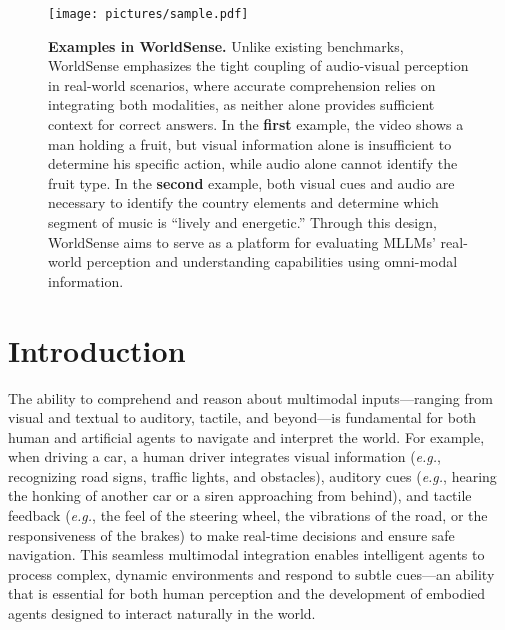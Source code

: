 \begin{figure*}[!htb]
  \centering
  \texttt{[image: pictures/sample.pdf]}
  \caption{\textbf{Examples in WorldSense.} 
  Unlike existing benchmarks, WorldSense emphasizes the tight coupling of audio-visual perception in real-world scenarios, where accurate comprehension relies on integrating both modalities, as neither alone provides sufficient context for correct answers. In the \textbf{first} example, the video shows a man holding a fruit, but visual information alone is insufficient to determine his specific action, while audio alone cannot identify the fruit type. In the \textbf{second} example, both visual cues and audio are necessary to identify the country elements and determine which segment of music is “lively and energetic.” Through this design, WorldSense aims to serve as a platform for evaluating MLLMs’ real-world perception and understanding capabilities using omni-modal information.}
  \label{fig:example}
  \vspace{-6mm}
\end{figure*}

\section{Introduction}


The ability to comprehend and reason about multimodal inputs—ranging from visual and textual to auditory, tactile, and beyond—is fundamental for both human and artificial agents to navigate and interpret the world. For example, when driving a car, a human driver integrates visual information ({\em e.g.}, recognizing road signs, traffic lights, and obstacles), auditory cues ({\em e.g.}, hearing the honking of another car or a siren approaching from behind), and tactile feedback ({\em e.g.}, the feel of the steering wheel, the vibrations of the road, or the responsiveness of the brakes) to make real-time decisions and ensure safe navigation. This seamless multimodal integration enables intelligent agents to process complex, dynamic environments and respond to subtle cues—an ability that is essential for both human perception and the development of embodied agents designed to interact naturally in the world.

